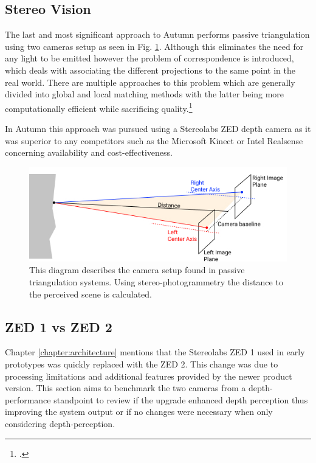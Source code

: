 \subsection{Stereo Vision}
The last and most significant approach to Autumn performs passive triangulation using two cameras setup as seen in Fig. \ref{fig:passiveTriangulation}. Although this eliminates the need for any light to be emitted however the problem of correspondence is introduced, which deals with associating the different projections to the same point in the real world. There are multiple approaches to this problem which are generally divided into global and local matching methods with the latter being more computationally efficient while sacrificing quality.\footcite{do2019review}

In Autumn this approach was pursued using a Stereolabs ZED depth camera as it was superior to any competitors such as the Microsoft Kinect or Intel Realsense concerning availability and cost-effectiveness. 

\begin{figure}
	\centering
	\includegraphics[width=0.8\linewidth]{img/PassiveTriangulation}
	\caption{
		This diagram describes the camera setup found in passive triangulation systems. Using stereo-photogrammetry the distance to the perceived scene is calculated. 
	}
	\label{fig:passiveTriangulation}
\end{figure}

\subsection{ZED 1 vs ZED 2}
Chapter \ref{chapter:architecture} mentions that the Stereolabs ZED 1 used in early prototypes was quickly replaced with the ZED 2. This change was due to processing limitations and additional features provided by the newer product version.
This section aims to benchmark the two cameras from a depth-performance standpoint to review if the upgrade enhanced depth perception thus improving the system output or if no changes were necessary when only considering depth-perception.

